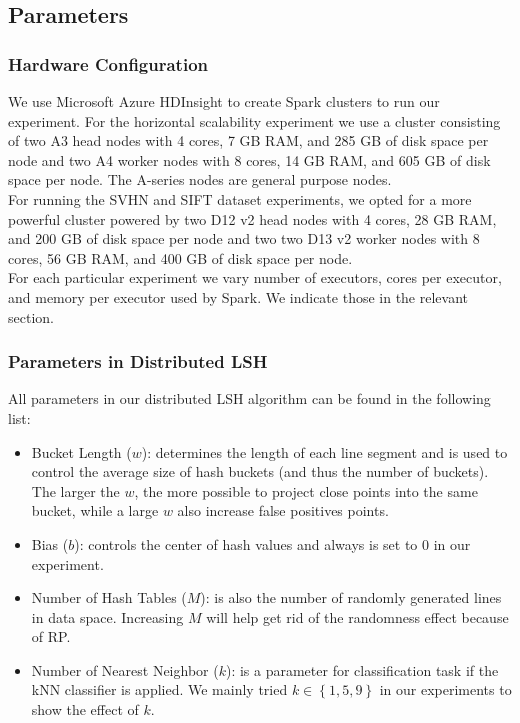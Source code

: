 \documentclass[letterpaper,twocolumn,10pt]{article}
\theoremstyle{definition}
\begin{document}
\subsection{Parameters}
\subsubsection{Hardware Configuration}

We use Microsoft Azure HDInsight to create Spark clusters to run our 
experiment. For the horizontal scalability experiment we use a cluster consisting 
of two A3 head nodes with 4 cores, 7 GB RAM, and 285 GB of disk space per node and 
two A4 worker nodes with 8 cores, 14 GB RAM, and 605 GB of disk space per node. The 
A-series nodes are general purpose nodes.  \\ 

For running the SVHN and SIFT dataset experiments, we opted for a more powerful 
cluster powered by two D12 v2 head nodes with 4 cores, 28 GB RAM, and 200 GB of 
disk space per node and two two D13 v2 worker nodes with 8 cores, 56 GB RAM, and 
400 GB of disk space per node. \\

For each particular experiment we vary number of executors, cores per executor, and 
memory per executor used by Spark. We indicate those in the relevant section.

\subsubsection{Parameters in Distributed LSH }

All parameters in our distributed LSH algorithm can be found in the following list:

\begin{itemize}
	\item Bucket Length ($w$): determines the length of each line segment and is used to control the average size of hash buckets (and thus the number of buckets). The larger the $w$, the more possible to project close points into the same bucket, while a large $w$ also increase false positives points.
	\item Bias ($b$): controls the center of hash values and always is set to 0 in our experiment.
	\item Number of Hash Tables ($M$): is also the number of randomly generated lines in data space. Increasing $M$ will help get rid of the randomness effect because of RP. 
	\item Number of Nearest Neighbor ($k$): is a parameter for classification task if the kNN classifier is applied. We mainly tried $k \in \left\{1, 5, 9\right\}$ in our experiments to show the effect of $k$.
\end{itemize}
\end{document}

